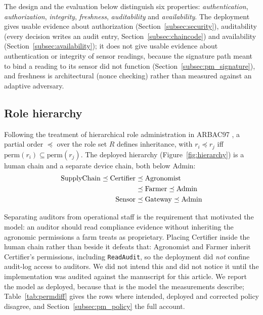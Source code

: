 \documentclass[a4paper,fleqn]{cas-sc}
\begin{document}
The design and the evaluation below distinguish six properties:
\emph{authentication}, \emph{authorization}, \emph{integrity},
\emph{freshness}, \emph{auditability} and \emph{availability}. The
deployment gives usable evidence about authorization
(Section~\ref{subsec:security}), auditability (every decision writes an
audit entry, Section~\ref{subsec:chaincode}) and availability
(Section~\ref{subsec:availability}); it does not give usable evidence about
authentication or integrity of sensor readings, because the signature path
meant to bind a reading to its sensor did not function
(Section~\ref{subsec:pm_signature}), and freshness is architectural (nonce
checking) rather than measured against an adaptive adversary.

\subsection{Role hierarchy}
\label{subsec:roles}

Following the treatment of hierarchical role administration in ARBAC97
\cite{sandhu1999arbac97}, a partial order $\preceq$ over the role set $R$
defines inheritance, with $r_i \preceq r_j$ iff
$\mathrm{perm}(r_i) \subseteq \mathrm{perm}(r_j)$. The deployed hierarchy
(Figure~\ref{fig:hierarchy}) is a human chain and a separate device chain,
both below Admin:
\begin{align}
\mathrm{SupplyChain} \preceq \mathrm{Certifier}
  &\preceq \mathrm{Agronomist} \notag\\
  &\preceq \mathrm{Farmer} \preceq \mathrm{Admin}
  \label{eq:human}\\
\mathrm{Sensor} &\preceq \mathrm{Gateway} \preceq \mathrm{Admin}
  \label{eq:device}
\end{align}

Separating auditors from operational staff is the requirement that motivated
the model: an auditor should read compliance evidence without inheriting the
agronomic permissions a farm treats as proprietary. Placing Certifier inside
the human chain rather than beside it defeats that: Agronomist and Farmer
inherit Certifier's permissions, including \texttt{ReadAudit}, so the
deployment did \emph{not} confine audit-log access to auditors. We did not
intend this and did not notice it until the implementation was audited
against the manuscript for this article. We report the model as deployed,
because that is the model the measurements describe; Table~\ref{tab:permdiff}
gives the rows where intended, deployed and corrected policy disagree, and
Section~\ref{subsec:pm_policy} the full account.
\end{document}
